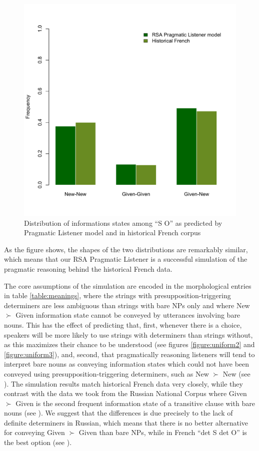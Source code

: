 \documentclass[output=paper,modfonts,nonflat]{langsci/langscibook}
\begin{document}
\begin{figure}
\includegraphics[scale = 0.45]{figures/plotModelComparison}
\caption{Distribution of informations states among ``S O'' as predicted by Pragmatic Listener model and in historical French corpus}\label{figure:models}
\end{figure}

As the figure shows, the shapes of the two distributions are remarkably similar, which means that our RSA Pragmatic Listener is a successful simulation of the pragmatic reasoning behind the historical French data. 

The core assumptions of the simulation are encoded in the morphological entries in table \ref{table:meanings}, where the strings with presupposition-triggering determiners are less ambiguous than strings with bare NPs only and where New $\succ$ Given information state cannot be conveyed by utterances involving bare nouns. This has the effect of predicting that, first, whenever there is a choice, speakers will be more likely to use strings with determiners than strings without, as this maximizes their chance to be understood (see figures \ref{figure:uniform2} and \ref{figure:uniform3}), and, second, that pragmatically reasoning listeners will tend to interpret bare nouns as conveying information states which could not have been conveyed using presupposition-triggering determiners, such as New $\succ$ New (see ). The simulation results match historical French data very closely, while they contrast with the data we took from the Russian National Corpus where Given $\succ$ Given is the second frequent information state of a transitive clause with bare nouns (see ). We suggest that the differences is due precisely to the lack of definite determiners in Russian, which means that there is no better alternative for conveying Given $\succ$ Given than bare NPs, while in French ``{\sc det} S {\sc det} O'' is the best option (see ). 
\end{document}
